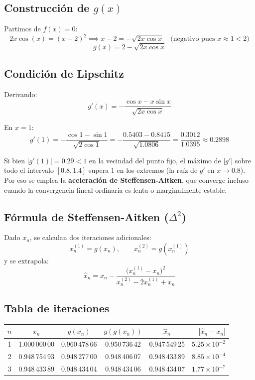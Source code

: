 \documentclass[12pt,a4paper]{article}
\begin{document}
\subsection*{Construcci\'on de $g(x)$}

Partimos de $f(x)=0$:
\[
  2x\cos(x) = (x-2)^2 \implies x-2 = -\sqrt{2x\cos x}
  \quad\text{(negativo pues $x\approx 1 < 2$)}
\]
\[
  \boxed{g(x) = 2 - \sqrt{2x\cos x}}
\]

\subsection*{Condici\'on de Lipschitz}

Derivando:
\[
  g'(x) = -\frac{\cos x - x\sin x}{\sqrt{2x\cos x}}
\]

En $x=1$:
\[
  g'(1) = -\frac{\cos 1 - \sin 1}{\sqrt{2\cos 1}}
        = -\frac{0.5403 - 0.8415}{\sqrt{1.0806}}
        = \frac{0.3012}{1.0395}
        \approx 0.2898
\]

Si bien $|g'(1)|=0.29 < 1$ en la vecindad del punto fijo, el m\'aximo de
$|g'|$ sobre todo el intervalo $[0.8,1.4]$ supera 1 en los extremos
(la ra\'iz de $g'$ en $x\to0.8$). Por eso se emplea la
\textbf{aceleraci\'on de Steffensen-Aitken}, que converge incluso cuando la
convergencia lineal ordinaria es lenta o marginalmente estable.

\subsection*{F\'ormula de Steffensen-Aitken ($\Delta^2$)}

Dado $x_n$, se calculan dos iteraciones adicionales:
\[
  x_n^{(1)} = g(x_n), \qquad x_n^{(2)} = g\!\left(x_n^{(1)}\right)
\]
y se extrapola:
\[
  \hat{x}_n = x_n - \frac{\bigl(x_n^{(1)}-x_n\bigr)^2}{x_n^{(2)}-2x_n^{(1)}+x_n}
\]

\subsection*{Tabla de iteraciones}

\begin{center}
\begin{tabular}{ccccc r}
\toprule
$n$ & $x_n$ & $g(x_n)$ & $g(g(x_n))$ & $\hat{x}_n$ & $|\hat{x}_n - x_n|$ \\
\midrule
1 & 1.000\,000\,00 & 0.960\,478\,66 & 0.950\,736\,42 & 0.947\,549\,25 & $5.25\times10^{-2}$ \\
2 & 0.948\,754\,93 & 0.948\,277\,00 & 0.948\,406\,07 & 0.948\,433\,89 & $8.85\times10^{-4}$ \\
3 & 0.948\,433\,89 & 0.948\,434\,04 & 0.948\,434\,06 & 0.948\,434\,07 & $1.77\times10^{-7}$ \\
\bottomrule
\end{tabular}
\end{center}
\end{document}
